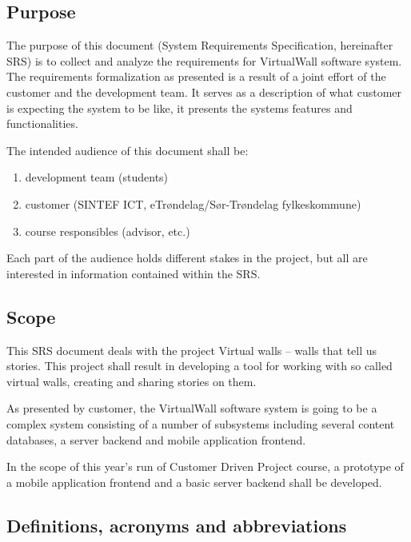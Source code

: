 \documentclass[11pt]{book}
\begin{document}
\subsection{Purpose}
The purpose of this document (System Requirements Specification, hereinafter SRS) is to collect and analyze the requirements for VirtualWall software system. The requirements formalization as presented is a result of a joint effort of the customer and the development team. It serves as a description of what customer is expecting the system to be like, it presents the systems features and functionalities.

The intended audience of this document shall be:

\begin{enumerate}
  \item development team (students)
  \item customer (SINTEF ICT, eTrøndelag/Sør-Trøndelag fylkeskommune)
  \item course responsibles (advisor, etc.)
\end{enumerate}

Each part of the audience holds different stakes in the project, but all are interested in information contained within the SRS.

\subsection{Scope}
This SRS document deals with the project Virtual walls – walls that tell us stories. This project shall result in developing a tool for working with so called virtual walls, creating and sharing stories on them.

As presented by customer, the VirtualWall software system is going to be a complex system consisting of a number of subsystems including several content databases, a server backend and mobile application frontend.

In the scope of this year's run of Customer Driven Project course, a prototype of a mobile application frontend and a basic server backend shall be developed.

\subsection{Definitions, acronyms and abbreviations}
\end{document}
